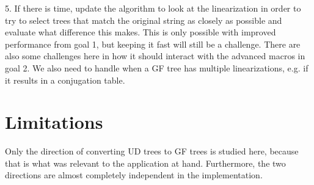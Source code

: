 5. If there is time, update the algorithm to look at the linearization in order to try to select trees that match the original string as closely as possible and evaluate what difference this makes. This is only possible with improved performance from goal 1, but keeping it fast will still be a challenge. There are also some challenges here in how it should interact with the advanced macros in goal 2. We also need to handle when a GF tree has multiple linearizations, e.g. if it results in a conjugation table.





\section{Limitations}

Only the direction of converting UD trees to GF trees is studied here, because that is what was relevant to the application at hand. Furthermore, the two directions are almost completely independent in the implementation.



%


